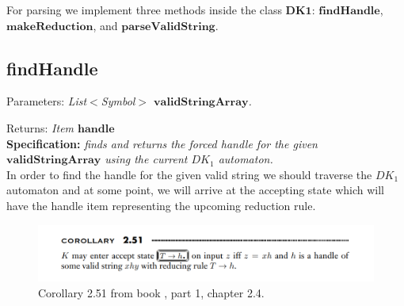 For parsing we implement three methods inside the class \(\boldsymbol{DK1}\):  \(\boldsymbol{findHandle}\), \(\boldsymbol{makeReduction}\), and \(\boldsymbol{parseValidString}\).

\vspace{10pt}

\subsection{findHandle}

Parameters: \textit{List\(<\)Symbol\(>\) \(\boldsymbol{validStringArray}\).}

Returns: \textit{Item \(\boldsymbol{handle}\)}\\

\textbf{Specification:} \textit{finds and returns the forced handle for the given \(\boldsymbol{validStringArray}\) using the current \(DK_{1}\) automaton.}\\

In order to find the handle for the given valid string we should traverse the \(DK_{1}\) automaton and at some point, we will arrive at the accepting state which will have the handle item representing the upcoming reduction rule.

\begin{figure}[h!]
    \includegraphics[width=\linewidth]{Identify Handle.png}
    \caption{Corollary 2.51 from book \cite{sipser}, part 1, chapter 2.4.}
    \label{4}
\end{figure}

\vspace{10pt}

